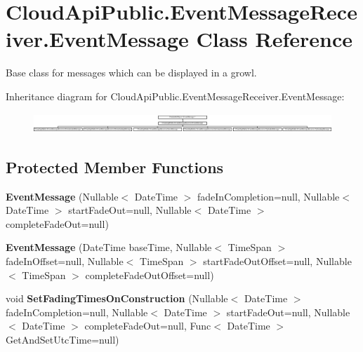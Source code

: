 \hypertarget{class_cloud_api_public_1_1_event_message_receiver_1_1_event_message}{\section{Cloud\-Api\-Public.\-Event\-Message\-Receiver.\-Event\-Message Class Reference}
\label{class_cloud_api_public_1_1_event_message_receiver_1_1_event_message}
}


Base class for messages which can be displayed in a growl.  


Inheritance diagram for Cloud\-Api\-Public.\-Event\-Message\-Receiver.\-Event\-Message\-:\begin{figure}[H]
\begin{center}
\leavevmode
\includegraphics[height=0.750670cm]{class_cloud_api_public_1_1_event_message_receiver_1_1_event_message}
\end{center}
\end{figure}
\subsection*{Protected Member Functions}
\begin{DoxyCompactItemize}
\item 
\hypertarget{class_cloud_api_public_1_1_event_message_receiver_1_1_event_message_a469f23b2ec000e5f2dc61f9c7d230df4}{{\bfseries Event\-Message} (Nullable$<$ Date\-Time $>$ fade\-In\-Completion=null, Nullable$<$ Date\-Time $>$ start\-Fade\-Out=null, Nullable$<$ Date\-Time $>$ complete\-Fade\-Out=null)}\label{class_cloud_api_public_1_1_event_message_receiver_1_1_event_message_a469f23b2ec000e5f2dc61f9c7d230df4}

\item 
\hypertarget{class_cloud_api_public_1_1_event_message_receiver_1_1_event_message_ae60772cdfe067cec0e9079be66353bf2}{{\bfseries Event\-Message} (Date\-Time base\-Time, Nullable$<$ Time\-Span $>$ fade\-In\-Offset=null, Nullable$<$ Time\-Span $>$ start\-Fade\-Out\-Offset=null, Nullable$<$ Time\-Span $>$ complete\-Fade\-Out\-Offset=null)}\label{class_cloud_api_public_1_1_event_message_receiver_1_1_event_message_ae60772cdfe067cec0e9079be66353bf2}

\item 
\hypertarget{class_cloud_api_public_1_1_event_message_receiver_1_1_event_message_a9a4125f4fe9d8eaa533937762cffa040}{void {\bfseries Set\-Fading\-Times\-On\-Construction} (Nullable$<$ Date\-Time $>$ fade\-In\-Completion=null, Nullable$<$ Date\-Time $>$ start\-Fade\-Out=null, Nullable$<$ Date\-Time $>$ complete\-Fade\-Out=null, Func$<$ Date\-Time $>$ Get\-And\-Set\-Utc\-Time=null)}\label{class_cloud_api_public_1_1_event_message_receiver_1_1_event_message_a9a4125f4fe9d8eaa533937762cffa040}

\end{DoxyCompactItemize}
